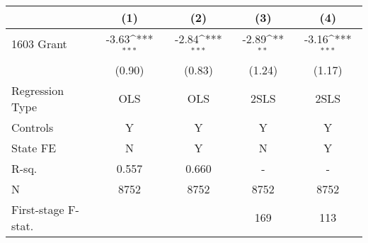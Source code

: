 {
\def\sym#1{\ifmmode^{#1}\else\(^{#1}\)\fi}
\begin{tabular}{l*{4}{c}}
\toprule
                &\multicolumn{1}{c}{(1)}         &\multicolumn{1}{c}{(2)}         &\multicolumn{1}{c}{(3)}         &\multicolumn{1}{c}{(4)}         \\
\midrule
1603 Grant      &    -3.63\sym{***}&    -2.84\sym{***}&    -2.89\sym{**} &    -3.16\sym{***}\\
                &   (0.90)         &   (0.83)         &   (1.24)         &   (1.17)         \\
\midrule
Regression Type &      OLS         &      OLS         &     2SLS         &     2SLS         \\
Controls        &        Y         &        Y         &        Y         &        Y         \\
State FE        &        N         &        Y         &        N         &        Y         \\
R-sq.           &    0.557         &    0.660         &        -         &        -         \\
N               &     8752         &     8752         &     8752         &     8752         \\
First-stage F-stat.&                  &                  &      169         &      113         \\
\bottomrule
\end{tabular}
}
